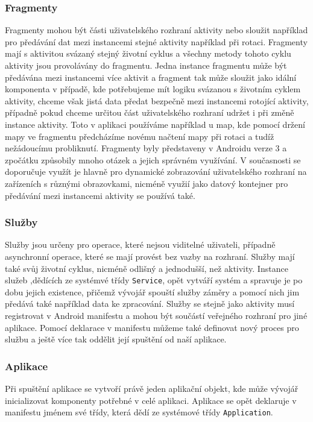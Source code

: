 \documentclass{article}
\begin{document}
\subsubsection{Fragmenty}
Fragmenty mohou být části uživatelského rozhraní aktivity nebo sloužit například pro předávání
dat mezi instancemi stejné aktivity například při rotaci. Fragmenty mají s aktivitou svázaný stejný životní cyklus
a všechny metody tohoto cyklu aktivity jsou provolávány do fragmentu. Jedna instance fragmentu
může být předávána mezi instancemi více aktivit a fragment tak může sloužit jako idální komponenta
v případě, kde potřebujeme mít logiku svázanou s životním cyklem aktivity, chceme však jistá data
předat bezpečně mezi instancemi rotojící aktivity, případně pokud chceme určitou část uživatelského
rozhraní udržet i při změně instance aktivity. Toto v aplikaci používáme například u map, kde pomocí
držení mapy ve fragmentu předcházíme novému načtení mapy při rotaci a tudíž nežádoucímu probliknutí.
Fragmenty byly představeny v Androidu verze 3 a zpočátku způsobily mnoho otázek a jejich správném využívání.
V současnosti se doporučuje využít je hlavně pro dynamické zobrazování uživatelského rozhraní na
zařízeních s různými obrazovkami\cite{androiddevelopers}, nicméně využií jako datový kontejner pro
předávání mezi instancemi aktivity se používá také.

\subsubsection{Služby}
Služby jsou určeny pro operace, které nejsou viditelné uživateli, případně asynchronní operace, které se mají
provést bez vazby na rozhraní. Služby mají také svůj životní cyklus, nicméně odlišný a jednodušší,
než aktivity. Instance služeb ,dědících ze systémvé třídy \texttt{Service}, opět vytváří
systém a spravuje je po dobu jejich existence,
přičemž vývojář spouští služby záměry a pomocí nich jim předává také například data ke zpracování.
Služby se stejně jako aktivity musí registrovat v Android manifestu a mohou být součástí veřejného
rozhraní pro jiné aplikace. Pomocí deklarace v manifestu můžeme také definovat nový proces pro službu
a ještě více tak oddělit její spuštění od naší aplikace.

\subsubsection{Aplikace}
Při spuštění aplikace se vytvoří právě jeden aplikační objekt, kde může vývojář inicializovat
komponenty potřebné v celé aplikaci. Aplikace se opět deklaruje v manifestu jménem své třídy, která
dědí ze systémové třídy \texttt{Application}.
\end{document}
